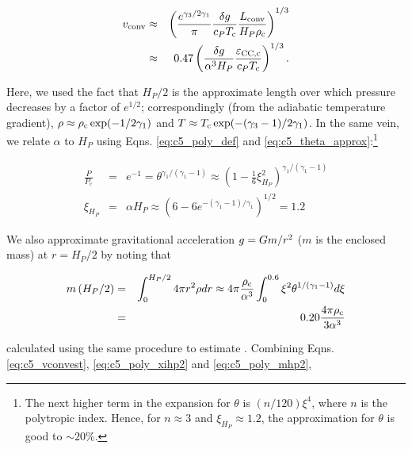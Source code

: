 \begin{eqnarray}
\vconv &\approx& \left(\frac{e^{\gamma_3/2\gamma_1}}{\pi}\frac{\delta \gacc}{c_P \Tc}\frac{\Lconv}{H_P \rhoc}\right)^{1/3} \nonumber \\
	&\approx& 0.47\left(\frac{\delta \gacc}{\alpha^3H_P}\frac{\epscentral}{c_P \Tc}\right)^{1/3}.
\label{eq:c5_vconvest}
\end{eqnarray}


\noindent Here, we used the fact that $H_P/2$ is the approximate length over which pressure decreases by a factor of $e^{1/2}$; correspondingly (from the adiabatic temperature gradient), $\rho \approx \rhoc\exp(-1/2\gamma_1)$ and $T \approx \Tc\exp(-(\gamma_3 - 1)/2\gamma_1)$.  In the same vein, we relate $\alpha$ to $H_P$ using Eqns. \ref{eq:c5_poly_def} and \ref{eq:c5_theta_approx}:\footnote{The next higher term in the expansion for $\theta$ is $(n/120)\xi^4$, where $n$ is the polytropic index.  Hence, for $n \approx 3$ and $\xi_{H_P} \approx 1.2$, the approximation for $\theta$ is good to $\sim20$\%.}

\begin{eqnarray}
\frac{P}{P_\mathrm{c}} &=& e^{-1} = \theta^{\gamma_1/(\gamma_1 - 1)} \approx \left(1 - \frac{1}{6}\xi_{H_P}^2\right)^{\gamma_1/(\gamma_1 - 1)}  \nonumber \\
\xi_{H_P} &=& \alpha H_P \approx \left(6 - 6e^{-(\gamma_1 - 1)/\gamma_1}\right)^{1/2} = 1.2
\label{eq:c5_poly_xihp2}
\end{eqnarray}

\noindent We also approximate gravitational acceleration $\gacc = Gm/r^2$ ($m$ is the enclosed mass) at $r = H_P/2$ by noting that

\begin{eqnarray}
m\left(H_P/2\right) &=& \int_0^{H_P/2} 4\pi r^2\rho dr \approx 4\pi\frac{\rhoc}{\alpha^3}\int_0^{0.6}\xi^2\theta^{1/(\gamma_1 - 1)}d\xi \nonumber \\
&=& 0.20\frac{4\pi\rhoc}{3\alpha^3} 
\label{eq:c5_poly_mhp2}
\end{eqnarray}

\noindent calculated using the same procedure to estimate \Lconv.  Combining Eqns. \ref{eq:c5_vconvest}, \ref{eq:c5_poly_xihp2} and \ref{eq:c5_poly_mhp2},

